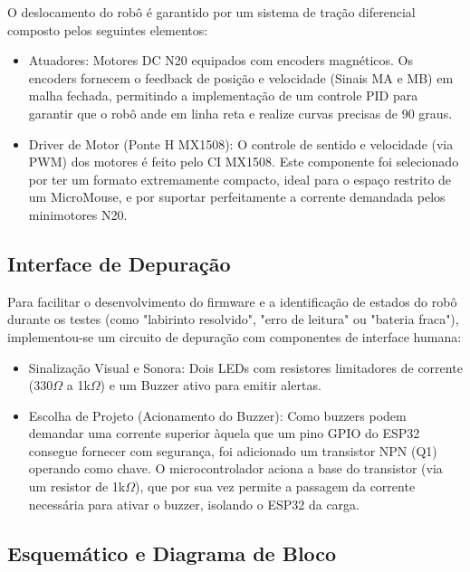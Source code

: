     O deslocamento do robô é garantido por um sistema de tração diferencial composto pelos seguintes elementos:
    
    \begin{itemize}
        \item Atuadores: Motores DC N20 equipados com encoders magnéticos. 
        Os encoders fornecem o feedback de posição e velocidade (Sinais MA e MB) em malha fechada, permitindo a implementação de um controle PID para garantir que o robô 
        ande em linha reta e realize curvas precisas de 90 graus.
        \item Driver de Motor (Ponte H MX1508): O controle de sentido e velocidade (via PWM) dos motores é feito pelo CI MX1508. 
        Este componente foi selecionado por ter um formato extremamente compacto, ideal para o espaço restrito de um MicroMouse, e por suportar perfeitamente a corrente 
        demandada pelos minimotores N20.
    \end{itemize}

\subsection{Interface de Depuração}

    Para facilitar o desenvolvimento do firmware e a identificação de estados do robô durante os testes 
    (como "labirinto resolvido", "erro de leitura" ou "bateria fraca"), implementou-se um circuito de depuração com componentes de interface humana:

    \begin{itemize}
        \item Sinalização Visual e Sonora: Dois LEDs com resistores limitadores de corrente (330$ \Omega $ a 1k$ \Omega $) e um Buzzer ativo para emitir alertas.
        \item Escolha de Projeto (Acionamento do Buzzer): Como buzzers podem demandar uma corrente superior àquela que um pino GPIO do ESP32 consegue fornecer com segurança, 
        foi adicionado um transistor NPN (Q1) operando como chave. 
        O microcontrolador aciona a base do transistor (via um resistor de 1k$ \Omega $), que por sua vez permite a passagem da corrente necessária para ativar o buzzer, 
        isolando o ESP32 da carga.
    \end{itemize}

\subsection{Esquemático e Diagrama de Bloco}

